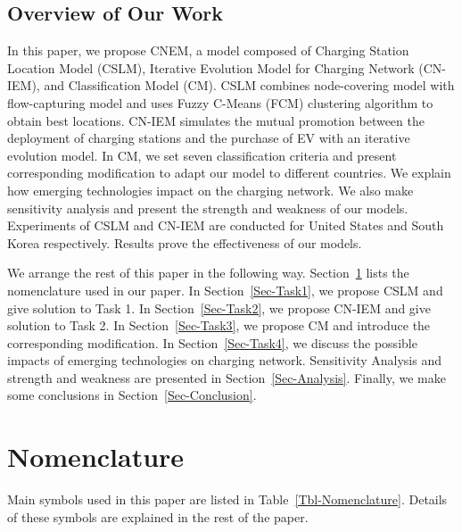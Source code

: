 \documentclass{mcmthesis}
\begin{document}
\subsection{Overview of Our Work}
In this paper, we propose CNEM, a model composed of Charging Station Location Model (CSLM), Iterative Evolution Model for Charging Network (CN-IEM), and Classification Model (CM). CSLM combines node-covering model with flow-capturing model and uses Fuzzy C-Means (FCM) clustering algorithm to obtain best locations. CN-IEM simulates the mutual promotion between the deployment of charging stations and the purchase of EV with an iterative evolution model. In CM, we set seven classification criteria and present corresponding modification to adapt our model to different countries. We explain how emerging technologies impact on the charging network. We also make sensitivity analysis and present the strength and weakness of our models. Experiments of CSLM and CN-IEM are conducted for United States and South Korea respectively. Results prove the effectiveness of our models.

We arrange the rest of this paper in the following way. Section~\ref{Sec-Nomenclature} lists the nomenclature used in our paper. In Section~\ref{Sec-Task1}, we propose CSLM and give solution to Task 1. In Section~\ref{Sec-Task2}, we propose CN-IEM and give solution to Task 2. In Section~\ref{Sec-Task3}, we propose CM and introduce the corresponding modification. In Section~\ref{Sec-Task4}, we discuss the possible impacts of emerging technologies on charging network. Sensitivity Analysis and strength and weakness are presented in Section~\ref{Sec-Analysis}. Finally, we make some conclusions in Section~\ref{Sec-Conclusion}.
\section{Nomenclature}\label{Sec-Nomenclature}
Main symbols used in this paper are listed in Table~\ref{Tbl-Nomenclature}. Details of these symbols are explained in the rest of the paper.
\end{document}
